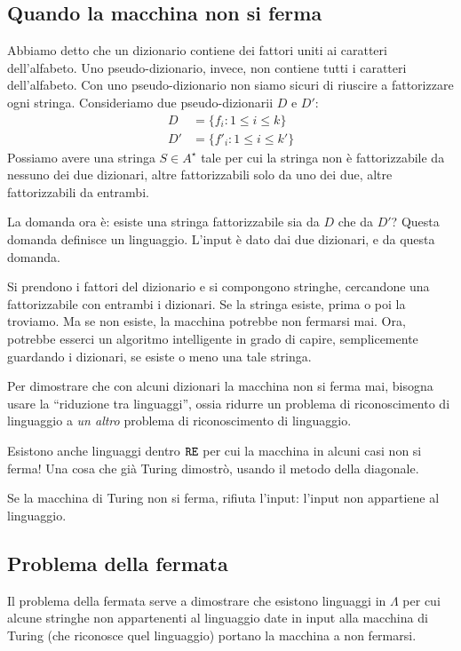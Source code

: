 \subsection{Quando la macchina non si ferma}

Abbiamo detto che un dizionario contiene dei fattori uniti ai caratteri dell'alfabeto. Uno pseudo-dizionario, invece, non contiene tutti i caratteri dell'alfabeto. Con uno pseudo-dizionario non siamo sicuri di riuscire a fattorizzare ogni stringa. Consideriamo due pseudo-dizionarii $D$ e $D'$:
\begin{align*}
D &= \{ f_i : 1 \le i \le k \} \\
D' &= \{ f'_i : 1 \le i \le k' \} 
\end{align*}
Possiamo avere una stringa $S \in A^{\star}$ tale per cui la stringa non \`e fattorizzabile da nessuno dei due dizionari, altre fattorizzabili solo da uno dei due, altre fattorizzabili da entrambi.

La domanda ora \`e: esiste una stringa fattorizzabile sia da $D$ che da $D'$? Questa domanda definisce un linguaggio. L'input \`e dato dai due dizionari, e da questa domanda.

Si prendono i fattori del dizionario e si compongono stringhe, cercandone una fattorizzabile con entrambi i dizionari. Se la stringa esiste, prima o poi la troviamo. Ma se non esiste, la macchina potrebbe non fermarsi mai. Ora, potrebbe esserci un algoritmo intelligente in grado di capire, semplicemente guardando i dizionari, se esiste o meno una tale stringa.

Per dimostrare che con alcuni dizionari la macchina non si ferma mai, bisogna usare la ``riduzione tra linguaggi'', ossia ridurre un problema di riconoscimento di linguaggio a \emph{un altro} problema di riconoscimento di linguaggio.

Esistono anche linguaggi dentro $\texttt{RE}$ per cui la macchina in alcuni casi non si ferma! Una cosa che gi\`a Turing dimostr\`o, usando il metodo della diagonale.

Se la macchina di Turing non si ferma, rifiuta l'input: l'input non appartiene al linguaggio.

\subsection{Problema della fermata}

Il problema della fermata serve a dimostrare che esistono linguaggi in $\Lambda$ per cui alcune stringhe non appartenenti al linguaggio date in input alla macchina di Turing (che riconosce quel linguaggio) portano la macchina a non fermarsi.

